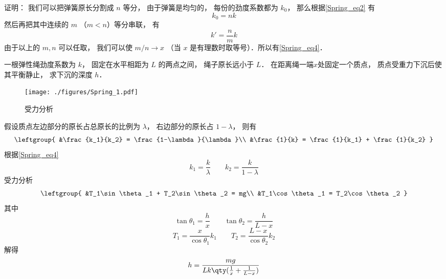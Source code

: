 证明： 我们可以把弹簧原长分割成 $n$ 等分， 由于弹簧是均匀的， 每份的劲度系数都为 $k_0$， 那么根据\autoref{Spring_eq2} 有
\begin{equation}
k_0 = nk
\end{equation}
然后再把其中连续的 $m$ （$m < n$）等分串联， 有
\begin{equation}
k' = \frac{n}{m}k
\end{equation}
由于以上的 $m, n$ 可以任取， 我们可以使 $m/n \to x$ （当 $x$ 是有理数时取等号）．所以有\autoref{Spring_eq4}．

\begin{example}{}
一根弹性绳劲度系数为 $k$， 固定在水平相距为 $L$ 的两点之间， 绳子原长远小于 $L$． 在距离绳一端$x$处固定一个质点， 质点受重力下沉后使其平衡静止， 求下沉的深度 $h$．
\begin{figure}[ht]
\centering
\texttt{[image: ./figures/Spring\_1.pdf]}
\caption{受力分析} \label{Spring_fig1}
\end{figure}
假设质点左边部分的原长占总原长的比例为 $\lambda$， 右边部分的原长占 $1-\lambda$， 则有
\begin{equation}
\leftgroup{
&\frac{k_1}{k_2} = \frac{1-\lambda}{\lambda}\\
&\frac{1}{k} = \frac{1}{k_1} + \frac{1}{k_2}
}
\end{equation}
根据\autoref{Spring_eq4} 
\begin{equation}
k_1 = \frac{k}{\lambda} \qquad
k_2 = \frac{k}{1-\lambda}
\end{equation}
受力分析
\begin{equation}
\leftgroup{
&T_1\sin\theta_1 + T_2\sin\theta_2 = mg\\
&T_1\cos\theta_1 = T_2\cos\theta_2
}
\end{equation}
其中
\begin{equation}
\tan\theta_1 = \frac{h}{x}
\qquad
\tan\theta_2 = \frac{h}{L-x}
\end{equation}
\begin{equation}
T_1 = \frac{x}{\cos\theta_1} k_1 \qquad
T_2 = \frac{L-x}{\cos\theta_2} k_2
\end{equation}
解得
\begin{equation}
h = \frac{mg}{Lk\qty(\frac{1}{x} + \frac{1}{L-x})}
\end{equation}
\end{example}
